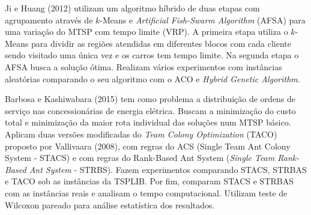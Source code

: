 Ji e Huang (2012) \cite{ji2012} utilizam um algoritmo híbrido de duas etapas com agrupamento através de $k$-Means e \textit{Artificial Fish-Swarm Algorithm} (AFSA) para uma variação do MTSP com tempo limite (VRP). A primeira etapa utiliza o $k$-Means para dividir as regiões atendidas em diferentes blocos com cada cliente sendo visitado uma única vez e os carros tem tempo limite. Na segunda etapa o AFSA busca a solução ótima. Realizam vários experimentos com instâncias aleatórias comparando o seu algoritmo com o ACO e \textit{Hybrid Genetic Algorithm}.

Barbosa e Kashiwabara (2015) \cite{barbosa2015aplicaccao} tem como problema a distribuição de ordens de serviço nas concessionárias de energia elétrica. Buscam a minimização do custo total e minimização da maior rota individual das soluções num MTSP básico. Aplicam duas versões modificadas do \textit{Team Colony Optimization} (TACO) proposto por Vallivaara (2008), com regras do ACS (Single Team Ant Colony System - STACS) e com regras do Rank-Based Ant System (\textit{Single Team Rank-Based Ant System} - STRBS). Fazem experimentos comparando STACS, STRBAS e TACO sob as instâncias da TSPLIB. Por fim, comparam STACS e STRBAS com as instâncias reais e analisam o tempo computacional. Utilizam teste de Wilcoxon pareado para análise estatística dos resultados.
